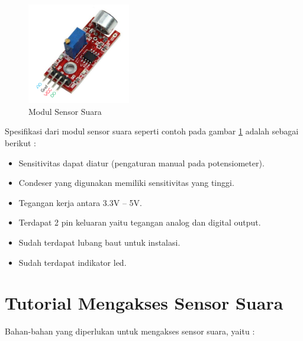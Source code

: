 \begin{figure}[ht]
\centerline{\includegraphics[width=0.4\textwidth]{figures/sssensorsuara.png}}
\caption{Modul Sensor Suara}
\label{sssensorsuara}
\end{figure}

Spesifikasi dari modul sensor suara seperti contoh pada gambar \ref{sssensorsuara} adalah sebagai berikut :

\begin{itemize}
\item Sensitivitas dapat diatur (pengaturan manual pada potensiometer).
\item Condeser yang digunakan memiliki sensitivitas yang tinggi.
\item Tegangan kerja antara 3.3V – 5V.
\item Terdapat 2 pin keluaran yaitu tegangan analog dan digital output.
\item Sudah terdapat lubang baut untuk instalasi.
\item Sudah terdapat indikator led.
\end{itemize}

\section{Tutorial Mengakses Sensor Suara}

\hspace{4mm} Bahan-bahan yang diperlukan untuk mengakses sensor suara, yaitu :

